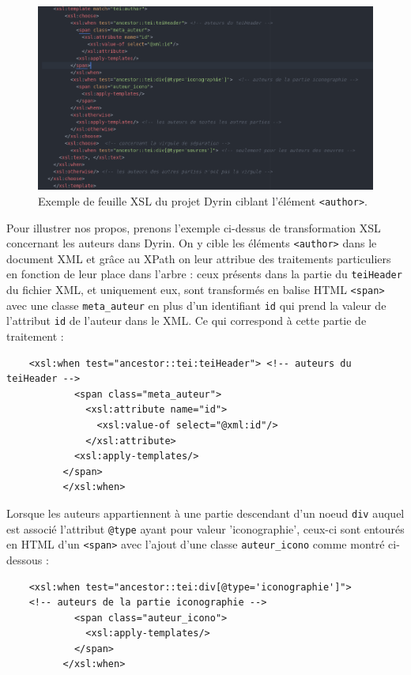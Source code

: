 \documentclass[a4paper,12pt,twoside]{book}
\begin{document}
    \begin{figure}[H]
    \centering
    \includegraphics[width=12cm]{img/autre/exemple_xsl.png}
    \caption{Exemple de feuille \acrshort{XSL} du projet Dyrin ciblant l'élément \texttt{<author>}.}
\end{figure}

    Pour illustrer nos propos, prenons l'exemple ci-dessus de transformation \acrshort{XSL} concernant les auteurs dans Dyrin. On y \og cible\fg{} les éléments \texttt{<author>} dans le document XML et grâce au XPath on leur attribue des traitements particuliers en fonction de leur place dans l'arbre : ceux présents dans la partie du \texttt{teiHeader} du fichier XML, et uniquement eux, sont transformés en balise HTML \texttt{<span>} avec une classe \texttt{meta\_auteur} en plus d'un identifiant \texttt{id} qui prend la valeur de l'attribut \texttt{id} de l'auteur dans le XML. Ce qui correspond à cette partie de traitement :
    
    \begin{verbatim}
    <xsl:when test="ancestor::tei:teiHeader"> <!-- auteurs du teiHeader -->
            <span class="meta_auteur">
              <xsl:attribute name="id">
                <xsl:value-of select="@xml:id"/>
              </xsl:attribute>
            <xsl:apply-templates/>
          </span>
          </xsl:when>
    \end{verbatim}
    
   Lorsque les auteurs appartiennent à une partie descendant d'un noeud \texttt{div} auquel est associé l'attribut \texttt{@type} ayant pour valeur 'iconographie', ceux-ci sont entourés en HTML d'un \texttt{<span>} avec l'ajout d'une classe \texttt{auteur\_icono} comme montré ci-dessous :
    
    \begin{verbatim}
    <xsl:when test="ancestor::tei:div[@type='iconographie']">
    <!-- auteurs de la partie iconographie -->
            <span class="auteur_icono">
              <xsl:apply-templates/>
            </span>
          </xsl:when>
    \end{verbatim}
    
\end{document}
